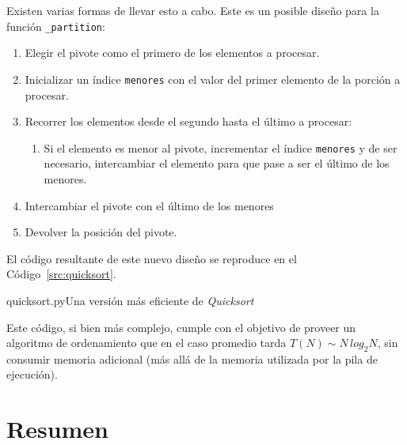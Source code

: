 Existen varias formas de llevar esto a cabo.  Este es un posible diseño
para la función \lstinline!_partition!:

\begin{enumerate}
\item Elegir el pivote como el primero de los elementos a procesar.
\item Inicializar un índice \lstinline!menores! con el valor del primer
elemento de la porción a procesar.
\item Recorrer los elementos desde el segundo hasta el último a procesar:
\begin{enumerate}
\item Si el elemento es menor al pivote, incrementar el índice
\lstinline!menores! y de ser necesario, intercambiar el elemento para que
pase a ser el último de los menores.
\end{enumerate}
\item Intercambiar el pivote con el último de los menores
\item Devolver la posición del pivote.
\end{enumerate}

El código resultante de este nuevo diseño se reproduce en el
Código~\ref{src:quicksort}.

\begin{codigo}{quicksort.py}{Una versión más eficiente de \emph{Quicksort}}

\label{src:quicksort}
\end{codigo}

Este código, si bien más complejo, cumple con el objetivo de proveer un
algoritmo de ordenamiento que en el caso promedio tarda
$T(N) \sim N \, log_2 N$, sin consumir memoria adicional (más allá de la
memoria utilizada por la pila de ejecución).

\section{Resumen}

